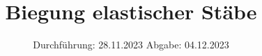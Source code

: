 

\subject{v103}
\title{Biegung elastischer Stäbe}
\date{
  Durchführung: 28.11.2023
  \hspace{3em}
  Abgabe: 04.12.2023
}



\maketitle
\thispagestyle{empty}
\tableofcontents
\newpage






\printbibliography{}

